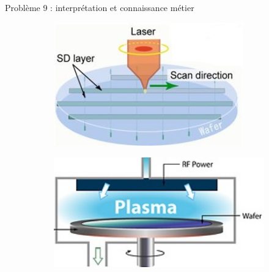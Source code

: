 \documentclass[10pt]{beamer}
\begin{document}
\begin{frame} {Problème 9 : interprétation et connaissance métier}
\vspace{0.01\textwidth}
\begin{figure}[H] 
\begin{subfigure}[l]{0.3\textwidth}
\centering
\includegraphics[width=0.9\textwidth, height=0.56\textwidth]{figures/laserprocess.jpg}
\label{fige}
\end{subfigure}%
\hspace{0.13\textwidth}
\begin{subfigure}[l]{0.3\textwidth}
\centering
\includegraphics[width=1\textwidth, height=0.6\textwidth]{figures/plasmaCVD.JPG}
\label{fige}
\end{subfigure}%


\end{figure}
\end{frame}
\end{document}
